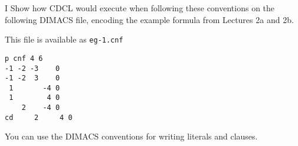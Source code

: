 \snewpage

\begin{problem}{I}
  Show how CDCL would execute when following these conventions on the following
  DIMACS file, encoding the example formula from Lectures 2a and 2b.

  This file is available as \texttt{eg-1.cnf}  
  \begin{lstlisting}
p cnf 4 6
-1 -2 -3    0
-1 -2  3    0
 1       -4 0
 1        4 0
    2    -4 0
cd     2     4 0
  \end{lstlisting}
  You can use the DIMACS conventions for writing literals and clauses.
  
\end{problem}

\snewpage

